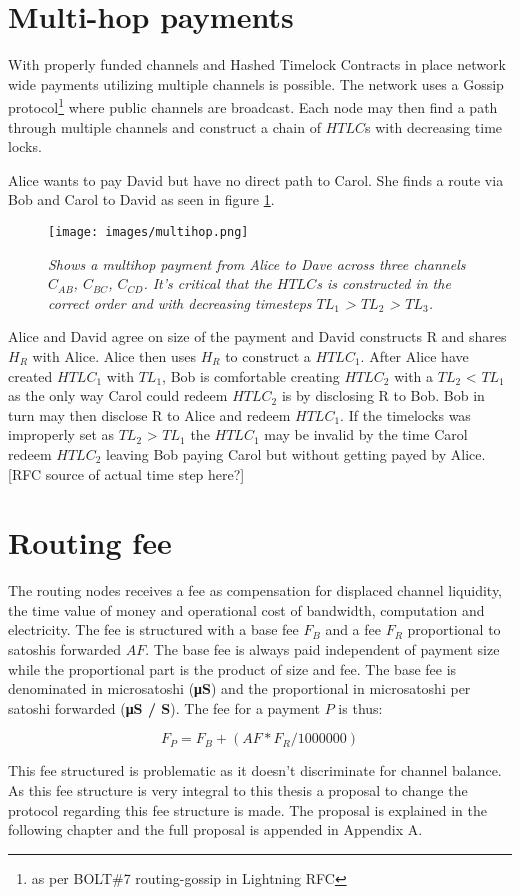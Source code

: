 \section{Multi-hop payments} 

With properly funded channels and Hashed Timelock Contracts in place network wide payments utilizing multiple channels is possible.
The network uses a Gossip protocol\footnote{as per BOLT\#7 routing-gossip in Lightning RFC\cite{repository:lightning:rfc}} where
public channels are broadcast. Each node may then find a path through multiple channels and construct a chain of $HTLC$s with decreasing time locks.

Alice wants to pay David but have no direct path to Carol. She finds a route via Bob and Carol to David as seen in figure \ref{fig:multihop}.

\begin{figure}[!htb]

	\centering
	\texttt{[image: images/multihop.png]}

	\caption{\textit{
			Shows a multihop payment from Alice to Dave across three channels $C_{AB}$, $C_{BC}$, $C_{CD}$. It's critical that the $HTLC$s is constructed in the correct order and with decreasing timesteps $TL_{1}$ > $TL_{2}$ > $TL_{3}$.
		}}
	\label{fig:multihop}

\end{figure}

Alice and David agree on size of the payment and David constructs R and shares $H_{R}$ with Alice. Alice then uses $H_{R}$ to construct a $HTLC_{1}$.
After Alice have created $HTLC_{1}$ with $TL_{1}$, Bob is comfortable creating $HTLC_{2}$ with a $TL_{2}$ < $TL_{1}$ as the only way Carol could redeem $HTLC_{2}$ is by disclosing R to Bob. Bob in turn may then disclose R to Alice and redeem $HTLC_{1}$. If the timelocks was improperly set as $TL_{2}$ > $TL_{1}$ the $HTLC_{1}$ may be invalid by the time Carol redeem $HTLC_{2}$ leaving Bob paying Carol but without getting payed by Alice. [RFC source of actual time step here?]

\section{Routing fee}

The routing nodes receives a fee as compensation for displaced channel liquidity, the time value of money and operational cost of bandwidth, computation and electricity. The fee is structured with a base fee $F_{B}$ and a fee $F_{R}$ proportional to satoshis forwarded $AF$. The base fee is always paid independent of payment size while the proportional part is the product of size and fee. The base fee is denominated in microsatoshi (\textbf{μS}) and the proportional in microsatoshi per satoshi forwarded (\textbf{μS / S}). The fee for a payment $P$ is thus:

\[ F_{P} = F_{B} + (AF * F_{R} / 1000000) \]

This fee structured is problematic as it doesn't discriminate for channel balance. As this fee structure is very integral to this thesis a proposal to change the protocol regarding this fee structure is made. The proposal is explained in the following chapter and the full proposal is appended in Appendix A. 
